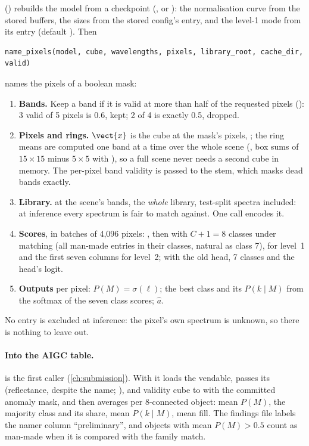  () rebuilds the model from a checkpoint (,  or
): the normalisation curve from the stored  buffers, the sizes from the stored config's
 entry, and the level-1 mode from its  entry (default ). Then
\begin{lstlisting}
name_pixels(model, cube, wavelengths, pixels, library_root, cache_dir, valid)
\end{lstlisting}
names the pixels of a boolean mask:
\begin{enumerate}
\item \textbf{Bands.} Keep a band if it is valid at more than half of the requested pixels
(): 3 valid of 5 pixels is 0.6, kept; 2 of 4 is exactly 0.5, dropped.
\item \textbf{Pixels and rings.} $\vect{x}$ is the cube at the mask's pixels, ; the ring means are
computed one band at a time over the whole scene (, box sums of $15\times15$ minus $5\times5$ with
), so a full scene never needs a second cube in memory. The per-pixel band validity is passed to
the stem, which masks dead bands exactly.
\item \textbf{Library.}  at the scene's bands, the \emph{whole} library, test-split spectra included:
at inference every spectrum is fair to match against. One  call encodes it.
\item \textbf{Scores}, in batches of 4,096 pixels: , then  with $C+1=8$ classes
under matching (all man-made entries in their classes, natural as class 7),  for level~1 and the
first seven columns for level~2; with the old head, 7 classes and the head's logit.
\item \textbf{Outputs} per pixel: $P(M)=\sigma(\ell)$; the best class and its $P(k\mid M)$ from the softmax of the seven
class scores; $\hat a$.
\end{enumerate}
No entry is excluded at inference: the pixel's own spectrum is unknown, so there is nothing to leave out.

\paragraph{Into the AIGC table.}  is the first caller (\cref{ch:submission}). With
 it loads the vendable, passes its  (reflectance, despite the
name; ),  and validity cube to  with the committed
anomaly mask, and then averages per 8-connected object: mean $P(M)$, the majority class and its share, mean
$P(k\mid M)$, mean fill. The findings file labels the namer column ``preliminary'', and objects with mean $P(M)>0.5$
count as man-made when it is compared with the family match.

